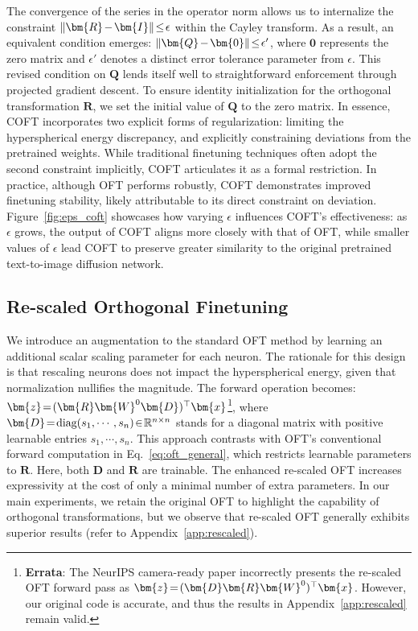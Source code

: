 {The convergence of the series in the operator norm allows us to internalize the constraint $\thickmuskip=2mu \medmuskip=2mu\|\bm{R}-\bm{I}\|\leq\epsilon$ within the Cayley transform. As a result, an equivalent condition emerges: $\thickmuskip=2mu \medmuskip=2mu \|\bm{Q}-\bm{0}\|\leq\epsilon'$, where $\bm{0}$ represents the zero matrix and $\epsilon'$ denotes a distinct error tolerance parameter from $\epsilon$. This revised condition on $\bm{Q}$ lends itself well to straightforward enforcement through projected gradient descent. To ensure identity initialization for the orthogonal transformation $\bm{R}$, we set the initial value of $\bm{Q}$ to the zero matrix. In essence, COFT incorporates two explicit forms of regularization: limiting the hyperspherical energy discrepancy, and explicitly constraining deviations from the pretrained weights. While traditional finetuning techniques often adopt the second constraint implicitly, COFT articulates it as a formal restriction. In practice, although OFT performs robustly, COFT demonstrates improved finetuning stability, likely attributable to its direct constraint on deviation. Figure~\ref{fig:eps_coft} showcases how varying $\epsilon$ influences COFT's effectiveness: as $\epsilon$ grows, the output of COFT aligns more closely with that of OFT, while smaller values of $\epsilon$ lead COFT to preserve greater similarity to the original pretrained text-to-image diffusion network.

\subsection{Re-scaled Orthogonal Finetuning}

We introduce an augmentation to the standard OFT method by learning an additional scalar scaling parameter for each neuron. The rationale for this design is that rescaling neurons does not impact the hyperspherical energy, given that normalization nullifies the magnitude. The forward operation becomes: $\thickmuskip=2mu \medmuskip=2mu\bm{z}=(\bm{R}\bm{W}^0\bm{D})^\top\bm{x}$\footnote{\textbf{Errata}: The NeurIPS camera-ready paper incorrectly presents the re-scaled OFT forward pass as $\thickmuskip=2mu \medmuskip=2mu\bm{z}=(\bm{D}\bm{R}\bm{W}^0)^\top\bm{x}$. However, our original code is accurate, and thus the results in Appendix~\ref{app:rescaled} remain valid.}, where $\thickmuskip=2mu \medmuskip=2mu \bm{D}=\text{diag}(s_1,\cdots,s_n)\in\mathbb{R}^{n\times n}$ stands for a diagonal matrix with positive learnable entries $s_1,\cdots,s_n$. This approach contrasts with OFT's conventional forward computation in Eq.~\eqref{eq:oft_general}, which restricts learnable parameters to $\bm{R}$. Here, both $\bm{D}$ and $\bm{R}$ are trainable. The enhanced re-scaled OFT increases expressivity at the cost of only a minimal number of extra parameters. In our main experiments, we retain the original OFT to highlight the capability of orthogonal transformations, but we observe that re-scaled OFT generally exhibits superior results (refer to Appendix~\ref{app:rescaled}).

}
